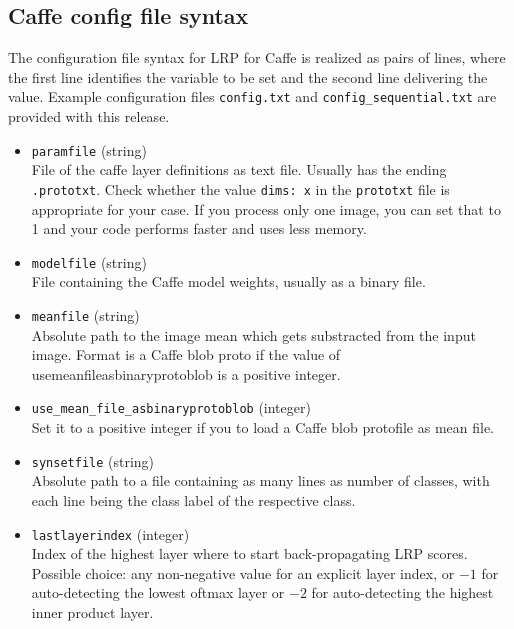 \documentclass[a4wide]{article}
\begin{document}
\subsection*{Caffe config file syntax}

The configuration file syntax for LRP for Caffe is realized as pairs of lines, where the first line identifies the variable to be set and the second line delivering the value. Example configuration files \texttt{config.txt} and \texttt{config\_sequential.txt} are provided with this release.

\begin{itemize}
	\item \texttt{param\textunderscore file} (string) \\
File of the caffe layer definitions as text file. Usually has the ending \texttt{.prototxt}. Check whether the value  \texttt{dims: x} in the \texttt{prototxt} file is appropriate for your case. If you process only one image, you can set that to 1 and your code performs faster and uses less memory.
	
	\item \texttt{model\textunderscore file} (string) \\
	File containing the Caffe model weights, usually as a binary file.
	
	\item \texttt{mean\textunderscore file} (string) \\
Absolute path to the image mean which gets substracted from the input image. Format is a Caffe blob proto if the value of use\textunderscore mean\textunderscore file\textunderscore asbinaryprotoblob is a positive integer.

	\item \texttt{use\_mean\_file\_asbinaryprotoblob} (integer) \\
	Set it to a positive integer if you to load a Caffe blob protofile as mean file.
	
	\item \texttt{synsetfile} (string) \\
Absolute path to a file containing as many lines as number of classes, with each line being the class label of the respective class. 

\item \texttt{lastlayerindex} (integer) \\
Index of the highest layer where to start back-propagating LRP scores. Possible choice: any non-negative value for an explicit layer index, or $-1$ for auto-detecting the lowest oftmax layer or $-2$ for auto-detecting the highest inner product layer.


\end{itemize}
\end{document}
